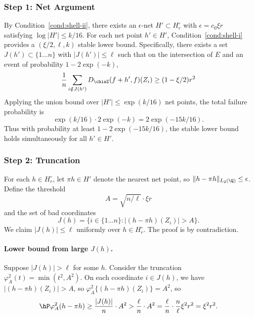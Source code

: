 \documentclass{article}
\begin{document}
\subsubsection{Step 1: Net Argument}

By Condition~\ref{cond:shell-ii}, there exists an $\epsilon$-net $H' \subset H_r^\circ$ with $\epsilon = c_0 \xi r$ satisfying $\log |H'| \le k/16$. For each net point $h' \in H'$, Condition~\ref{cond:shell-i} provides a $(\xi/2, \ell, k)$ stable lower bound. Specifically, there exists a set $J(h') \subset \{1 \ldots n\}$ with $|J(h')| \le \ell$ such that on the intersection of $E$ and an event of probability $1-2\exp(-k)$,
\[
\frac{1}{n} \sum_{i \notin J(h')} D_{\chisZ}(f+h', f)(Z_i) \ge (1-\xi/2) r^2
\]
Applying the union bound over $|H'| \le \exp(k/16)$ net points, the total failure probability is
\[
\exp(k/16) \cdot 2\exp(-k) = 2\exp(-15k/16).
\]
Thus with probability at least $1 - 2\exp(-15k/16)$, the stable lower bound holds simultaneously for all $h' \in H'$.

\subsubsection{Step 2: Truncation}

For each $h \in H_r^\circ$, let $\pi h \in H'$ denote the nearest net point, so $\|h - \pi h\|_{L_2(\Q)} \le \epsilon$. Define the threshold
\[
A = \sqrt{n/\ell} \cdot \xi r
\]
and the set of bad coordinates
\[
J(h) = \{i \in \{1 \ldots n\} : |(h - \pi h)(Z_i)| > A\}.
\]
We claim $|J(h)| \le \ell$ uniformly over $h \in H_r^\circ$. The proof is by contradiction.

\paragraph{Lower bound from large $J(h)$.} Suppose $|J(h)| > \ell$ for some $h$. Consider the truncation $\varphi_A^2(t) = \min(t^2, A^2)$. On each coordinate $i \in J(h)$, we have $|(h - \pi h)(Z_i)| > A$, so $\varphi_A^2\{(h-\pi h)(Z_i)\} = A^2$, so
\begin{equation}\label{eq:truncation-lower}
\hP \varphi_A^2(h - \pi h) \ge \frac{|J(h)|}{n} \cdot A^2 > \frac{\ell}{n} \cdot A^2 = \frac{\ell}{n} \cdot \frac{n}{\ell} \xi^2 r^2 = \xi^2 r^2.
\end{equation}
\end{document}
